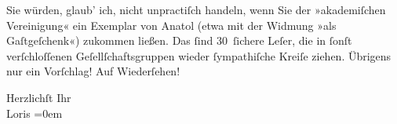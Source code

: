 \pstart
           Sie würden, glaub’ ich, nicht unpractiſch handeln, wenn Sie der »akademiſchen Vereinigung« ein Exemplar von Anatol (etwa mit der Widmung »als Gaſtgeſchenk«) zukommen ließen.
               Das{ }ſind 30 ſichere Leſer, die in{ }ſonſt verſchloſſenen Geſellſchaftsgruppen wieder{ }ſympathiſche Kreiſe ziehen. Übrigens nur ein Vorſchlag! Auf Wiederſehen!\pend
           
\pstart
           Herzlichſt Ihr{\\[\baselineskip]}\spacefill\mbox{Loris}\pend
           \leftskip=0em{}\endnumbering{}  \newcommand{\dateiname}{L00163}\newcommand{\titel}{Hugo von Hofmannsthal an Arthur Schnitzler, 25. 1. [1893]}\newcommand{\editorInnen}{Martin Anton Müller und Gerd-Hermann Susen}
